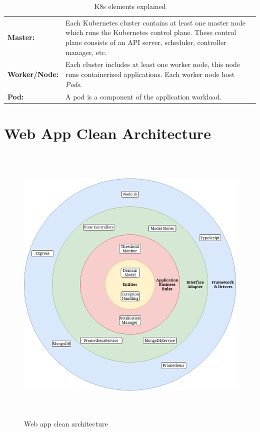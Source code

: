 \begin{table}[H]
  \begin{tabular*}{\textwidth}{p{3.5cm} | p{9cm}}
    \textbf{Master:}
      & Each Kubernetes cluster contains at least one master node which runs the Kubernetes control plane. These control plane consists of an API server, scheduler, controller manager, etc. \bigskip \\
    \textbf{Worker/Node:}
      & Each cluster includes at least one worker node, this node runs containerized applications. Each worker node host \textit{Pods}. \bigskip \\
    \textbf{Pod:}
      & A pod is a component of the application workload. \\
  \end{tabular*}
  \caption{K8s elements explained}
  \label{tab:k8s-elements-explained}
\end{table}

\section{Web App Clean Architecture}
\begin{figure}[H]
  \centering
  \includegraphics[height=14cm]{resources/clean_architecture.drawio.png}
  \caption{Web app clean architecture}
  \label{fig:web-app-architecture}
\end{figure}

